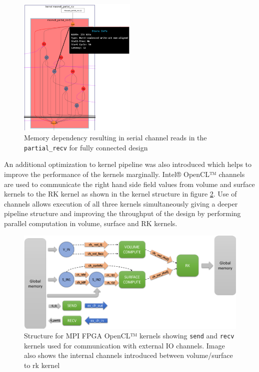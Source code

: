 \begin{figure}%
    \centering
    \includegraphics[width=0.5\textwidth]{images/serial_reads}
    \caption{Memory dependency resulting in serial channel reads in the \texttt{partial\_recv}
    for fully connected design}
    \label{fig:serial_reads}
\end{figure}


An additional optimization to kernel pipeline
was also introduced which helps to improve the performance of the kernels marginally.
Intel® OpenCL™ channels are used to communicate the right hand side field values
from volume and surface kernels to the RK kernel as shown in the kernel structure
in figure \ref{fig:iochan_kernstruc}. Use of channels allows execution of all three
kernels simultaneously giving a deeper pipeline structure and improving the throughput
of the design by performing parallel computation in volume, surface and RK kernels.

\begin{figure}[h]%
    \centering
    \includegraphics[width=1.0\textwidth]{images/iochan_kernstruc}
    \caption{Structure for MPI FPGA OpenCL™ kernels showing \texttt{send} and \texttt{recv}
    kernels used for communication with external IO channels. Image also shows the internal
    channels introduced between volume/surface to rk kernel}
    \label{fig:iochan_kernstruc}
\end{figure}

